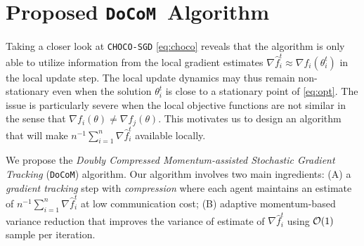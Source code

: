 \documentclass[10pt]{article} %
\theoremstyle{plain}
\theoremstyle{definition}
\theoremstyle{remark}
\newcommand{\aname}{{\tt DoCoM}}
\newcommand{\stocgrdf}{\nabla \widehat{f}}
\begin{document}
\section{Proposed \aname~Algorithm}\vspace{-.1cm}



Taking a closer look at {\tt CHOCO-SGD} \eqref{eq:choco} reveals that the algorithm is only able to utilize information from the local gradient estimates $\stocgrdf_i^t \approx \nabla f_i( \theta_i^t )$ in the local update step. The local update dynamics may thus remain non-stationary even when the solution $\theta_i^t$ is close to a stationary point of \eqref{eq:opt}. The issue is particularly severe when the local objective functions are not similar in the sense that $\nabla f_i( \theta ) \neq \nabla f_j( \theta )$. 
This motivates us to design an algorithm that will make $n^{-1} \sum_{i=1}^n \stocgrdf_i^t$ available locally. 

We propose the \emph{Doubly Compressed Momentum-assisted Stochastic Gradient Tracking} (\aname) algorithm. 
Our algorithm involves two main ingredients: {\sf (A)} a \emph{gradient tracking} step with \emph{compression} where each agent maintains an estimate of $n^{-1} \sum_{i=1}^n \stocgrdf_i^t$ at low communication cost; {\sf (B)} adaptive momentum-based variance reduction that improves the variance of estimate of $\stocgrdf_i^t$ using ${\cal O}(1)$ sample per iteration. 
\end{document}
